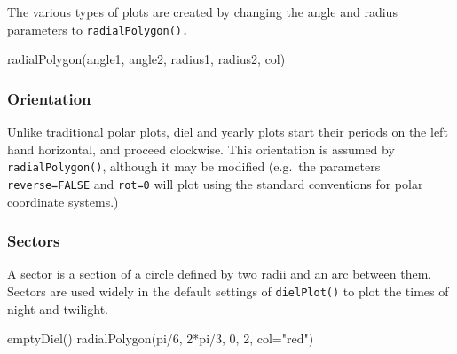 \documentclass[
]{book}
\newenvironment{Shaded}{\begin{snugshade}}{\end{snugshade}}
\newcommand{\AttributeTok}[1]{\textcolor[rgb]{0.77,0.63,0.00}{#1}}
\newcommand{\DecValTok}[1]{\textcolor[rgb]{0.00,0.00,0.81}{#1}}
\newcommand{\FunctionTok}[1]{\textcolor[rgb]{0.00,0.00,0.00}{#1}}
\newcommand{\NormalTok}[1]{#1}
\newcommand{\SpecialCharTok}[1]{\textcolor[rgb]{0.00,0.00,0.00}{#1}}
\newcommand{\StringTok}[1]{\textcolor[rgb]{0.31,0.60,0.02}{#1}}
\begin{document}
The various types of plots are created by changing the angle and radius parameters to \texttt{radialPolygon().}

\begin{Shaded}
\begin{Highlighting}[]
\FunctionTok{radialPolygon}\NormalTok{(angle1, angle2, radius1, radius2, col)}
\end{Highlighting}
\end{Shaded}

\hypertarget{orientation}{%
\subsubsection{Orientation}\label{orientation}}

Unlike traditional polar plots, diel and yearly plots start their periods on the left hand horizontal, and proceed clockwise. This orientation is assumed by \texttt{radialPolygon()}, although it may be modified (e.g.~the parameters \texttt{reverse=FALSE} and \texttt{rot=0} will plot using the standard conventions for polar coordinate systems.)

\hypertarget{sectors}{%
\subsubsection{Sectors}\label{sectors}}

A sector is a section of a circle defined by two radii and an arc between them. Sectors are used widely in the default settings of \texttt{dielPlot()} to plot the times of night and twilight.

\begin{Shaded}
\begin{Highlighting}[]
\FunctionTok{emptyDiel}\NormalTok{()}
\FunctionTok{radialPolygon}\NormalTok{(pi}\SpecialCharTok{/}\DecValTok{6}\NormalTok{, }\DecValTok{2}\SpecialCharTok{*}\NormalTok{pi}\SpecialCharTok{/}\DecValTok{3}\NormalTok{, }\DecValTok{0}\NormalTok{, }\DecValTok{2}\NormalTok{, }\AttributeTok{col=}\StringTok{"red"}\NormalTok{)}
\end{Highlighting}
\end{Shaded}
\end{document}

